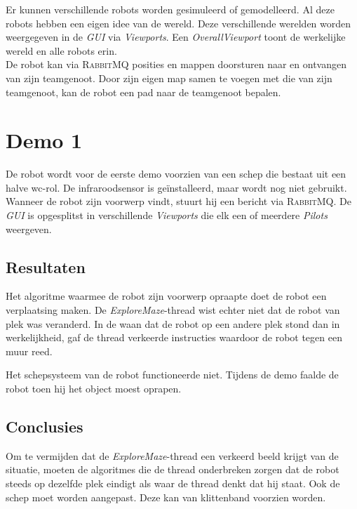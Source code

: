 \documentclass[eind]{penoverslag}
\begin{document}
Er kunnen verschillende robots worden gesimuleerd of gemodelleerd. Al deze robots hebben een eigen idee van de wereld. Deze verschillende werelden worden weergegeven in de \textit{GUI} via \textit{Viewports}. Een \textit{OverallViewport} toont de werkelijke wereld en alle robots erin.\\

De robot kan via \textsc{RabbitMQ} posities en mappen doorsturen naar en ontvangen van zijn teamgenoot. Door zijn eigen map samen te voegen met die van zijn teamgenoot, kan de robot een pad naar de teamgenoot bepalen.


\newpage
\makeappendix

\section{Demo 1}
\label{Asec:demo1}
De robot wordt voor de eerste demo voorzien van een schep die bestaat uit een halve wc-rol. De infraroodsensor is ge\"installeerd, maar wordt nog niet gebruikt. Wanneer de robot zijn voorwerp vindt, stuurt hij een bericht via \textsc{RabbitMQ}. De \textit{GUI} is opgesplitst in verschillende \textit{Viewports} die elk een of meerdere \textit{Pilots} weergeven.

\subsection{Resultaten}
\label{Assec:result1}
Het algoritme waarmee de robot zijn voorwerp opraapte doet de robot een verplaatsing maken. De \textit{ExploreMaze}-thread wist echter niet dat de robot van plek was veranderd. In de waan dat de robot op een andere plek stond dan in werkelijkheid, gaf de thread verkeerde instructies waardoor de robot tegen een muur reed.

Het schepsysteem van de robot functioneerde niet. Tijdens de demo faalde de robot toen hij het object moest oprapen. 

\subsection{Conclusies}
\label{Assec:conc1}
Om te vermijden dat de \textit{ExploreMaze}-thread een verkeerd beeld krijgt van de situatie, moeten de algoritmes die de thread onderbreken zorgen dat de robot steeds op dezelfde plek eindigt als waar de thread denkt dat hij staat.
Ook de schep moet worden aangepast. Deze kan van klittenband voorzien worden.
\end{document}

